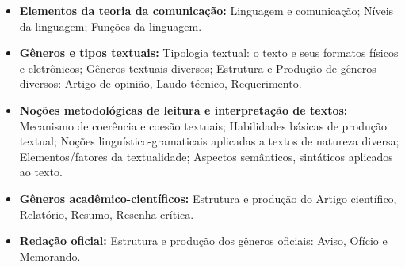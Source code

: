 \begin{itemize}
 \item \textbf{Elementos da teoria da comunicação:} Linguagem e comunicação; Níveis da linguagem; Funções da linguagem.

 \item \textbf{Gêneros e tipos textuais:} Tipologia textual: o texto e seus formatos físicos e eletrônicos; Gêneros textuais diversos; Estrutura e Produção de gêneros diversos: Artigo de opinião, Laudo técnico, Requerimento.

 \item \textbf{Noções metodológicas de leitura e interpretação de textos:} Mecanismo de coerência e coesão textuais; Habilidades básicas de produção textual; Noções linguístico-gramaticais aplicadas a textos de natureza diversa; Elementos/fatores da textualidade; Aspectos semânticos, sintáticos aplicados ao texto.

 \item \textbf{Gêneros acadêmico-científicos:} Estrutura e produção do Artigo científico, Relatório, Resumo, Resenha crítica.

 \item \textbf{Redação oficial:} Estrutura e produção dos gêneros oficiais: Aviso, Ofício e Memorando.

\end{itemize}







